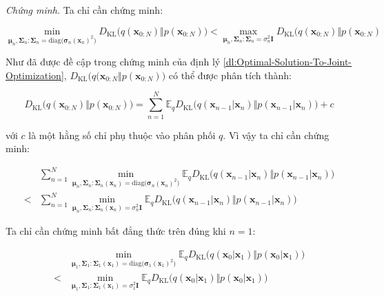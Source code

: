\documentclass[14pt, a4paper]{article}
\numberwithin{equation}{section}
\numberwithin{figure}{section}
\numberwithin{dl}{section}
\numberwithin{md}{section}
\numberwithin{bd}{section}
\numberwithin{dn}{section}
\numberwithin{hq}{section}
\begin{document}
    \textit{Chứng minh.}
    Ta chỉ cần chứng minh:

    \begin{equation}
        \min_{\boldsymbol{\mu}_n, \boldsymbol{\Sigma}_n:\boldsymbol{\Sigma}_n=\mathrm{diag}\big( \boldsymbol{\sigma}_n (\boldsymbol{x}_n)^2 \big)} D_{\mathrm{KL}} \big( q(\boldsymbol{x}_{0:N}) \Vert p(\boldsymbol{x}_{0:N}) \big) < \max_{\boldsymbol{\mu}_n, \boldsymbol{\Sigma}_n:\boldsymbol{\Sigma}_n=\sigma_n^2 \boldsymbol{I}} D_{\mathrm{KL}} \big( q(\boldsymbol{x}_{0:N}) \Vert p(\boldsymbol{x}_{0:N})
    \end{equation}

    Như đã được đề cập trong chứng minh của định lý \ref{dl:Optimal-Solution-To-Joint-Optimization}, $D_{\mathrm{KL}} \big( q(\boldsymbol{x}_{0:N} \Vert p(\boldsymbol{x}_{0:N}) \big)$ có thể được phân tích thành:

    \begin{equation}
        D_{\mathrm{KL}} \big( q(\boldsymbol{x}_{0:N}) \Vert p(\boldsymbol{x}_{0:N}) \big) = \sum_{n=1}^N \mathbb{E}_q D_{\mathrm{KL}} \big( q(\boldsymbol{x}_{n-1} \vert \boldsymbol{x}_n) \Vert p(\boldsymbol{x}_{n-1} \vert \boldsymbol{x}_n) \big) + c
    \end{equation}

    với $c$ là một hằng số chỉ phụ thuộc vào phân phối $q$. Vì vậy ta chỉ cần chứng minh:\

    \begin{equation}
        \begin{aligned}
            &\sum_{n=1}^N \min_{\boldsymbol{\mu}_n, \boldsymbol{\Sigma}_n:\boldsymbol{\Sigma}_n(\boldsymbol{x}_n)=\mathrm{diag}\big( \boldsymbol{\sigma}_n (\boldsymbol{x}_n)^2 \big)} \mathbb{E}_q D_{\mathrm{KL}} \big( q(\boldsymbol{x}_{n-1} \vert \boldsymbol{x}_n) \Vert p(\boldsymbol{x}_{n-1} \vert \boldsymbol{x}_n) \big) \\
            < &\sum_{n=1}^N \min_{\boldsymbol{\mu}_n, \boldsymbol{\Sigma}_n:\boldsymbol{\Sigma}_n(\boldsymbol{x}_n)=\sigma_n^2 \boldsymbol{I}} \mathbb{E}_q D_{\mathrm{KL}} \big( q(\boldsymbol{x}_{n-1} \vert \boldsymbol{x}_n) \Vert p(\boldsymbol{x}_{n-1} \vert \boldsymbol{x}_n) \big)
        \end{aligned}
    \end{equation}

    Ta chỉ cần chứng minh bất đẳng thức trên đúng khi $n=1$:

    \begin{equation}
        \begin{aligned}
            & \min_{\boldsymbol{\mu}_1, \boldsymbol{\Sigma}_1:\boldsymbol{\Sigma}_1(\boldsymbol{x}_1)=\mathrm{diag}\big( \boldsymbol{\sigma}_1 (\boldsymbol{x}_1)^2 \big)} \mathbb{E}_q D_{\mathrm{KL}} \big( q(\boldsymbol{x}_0 \vert \boldsymbol{x}_1) \Vert p(\boldsymbol{x}_0 \vert \boldsymbol{x}_1) \big) \\
            < & \min_{\boldsymbol{\mu}_1, \boldsymbol{\Sigma}_1:\boldsymbol{\Sigma}_1(\boldsymbol{x}_1)=\sigma_1^2 \boldsymbol{I}} \mathbb{E}_q D_{\mathrm{KL}} \big( q(\boldsymbol{x}_0\vert \boldsymbol{x}_1) \Vert p(\boldsymbol{x}_0 \vert \boldsymbol{x}_1) \big)
        \end{aligned}
    \end{equation}
\end{document}
